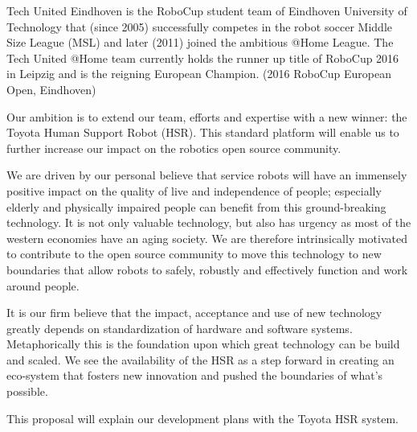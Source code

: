 Tech United Eindhoven is the RoboCup student team of Eindhoven University of Technology that (since 2005) successfully competes in the robot soccer Middle Size League (MSL) and later (2011) joined the ambitious @Home League. The Tech United @Home team currently holds the runner up title of RoboCup 2016 in Leipzig and is the reigning European Champion. (2016 RoboCup European Open, Eindhoven)

Our ambition is to extend our team, efforts and expertise with a new winner: the Toyota Human Support Robot (HSR). This standard platform will enable us to further increase our impact on the robotics open source community.

We are driven by our personal believe that service robots will have an immensely positive impact on the quality of live and independence of people; especially elderly and physically impaired people can benefit from this ground-breaking technology. It is not only valuable technology, but also has urgency as most of the western economies have an aging society. We are therefore intrinsically motivated to contribute to the open source community to move this technology to new boundaries that allow robots to safely, robustly and effectively function and work around people. 

It is our firm believe that the impact, acceptance and use of new technology greatly depends on standardization of hardware and software systems. Metaphorically this is the foundation upon which great technology can be build and scaled. We see the availability of the HSR as a step forward in creating an eco-system that fosters new innovation and pushed the boundaries of what’s possible. 

This proposal will explain our development plans with the Toyota HSR system.